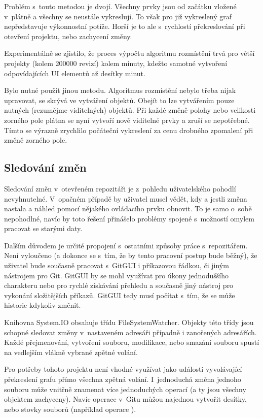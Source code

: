 \documentclass[
  biblatex,
  glossaries,
  index
]{kidiplom}
\begin{document}
Problém s~touto metodou je dvojí. Všechny prvky jsou od začátku vložené v~plátně a všechny se neustále vykreslují. To však pro již vykreslený graf nepředstavuje výkonnostní potíže. Horší je to ale s~rychlostí překreslování při otevření projektu, nebo zachycení změny.

Experimentálně se zjistilo, že proces výpočtu algoritmu rozmístění trvá pro větší projekty (kolem 200000 revizí) kolem minuty, kdežto samotné vytvoření odpovídajících UI elementů až desítky minut.

Bylo nutné použít jinou metodu. Algoritmus rozmístění nebylo třeba nijak upravovat,  se skrývá ve vytváření objektů. Obejít to lze vytvářením pouze nutných (rezumějme viditelných) objektů. Při každé změně polohy nebo velikosti zorného pole plátna se nyní vytvoří nově viditelné prvky a zruší se nepotřebné. Tímto se výrazně zrychlilo počáteční vykreslení za cenu drobného zpomalení při změně zorného pole.

\subsection{Sledování změn}
Sledování změn v~otevřeném repozitáři je z~pohledu uživatelského pohodlí nevyhnutelné. V~opačném případě by uživatel musel vědět, kdy a jestli změna nastala a náhled pomocí nějakého ovládacího prvku obnovit. To je samo o~sobě nepohodlné, navíc by toto řešení přinášelo problémy spojené s~možností omylem pracovat se starými daty.

Dalším důvodem je určité propojení s~ostatními způsoby práce s~repozitářem. Není vyloučeno (a dokonce se s~tím, že by tento pracovní postup bude běžný), že uživatel bude současně pracovat s~GitGUI i příkazovou řádkou, či jiným nástrojem pro Git. GitGUI by se mohl využívat pro úkony jednoduššího charakteru nebo pro rychlé získávání přehledu a současně jiný nástroj pro vykonání složitějších příkazů.
GitGUI tedy musí počítat s~tím, že se může historie kdykoliv změnit.

Knihovna System.IO obsahuje třídu FileSystemWatcher. Objekty této třídy jsou schopné sledovat změny v~nastaveném adresáři případně i zanořených adresářích. Každé přejmenování, vytvoření souboru, modifikace, nebo smazání souboru spustí na vedlejším vlákně vybrané zpětné volání.

Pro potřeby tohoto projektu není vhodné využívat jako události vyvolávající překreslení grafu přímo všechna zpětná volání. I~jednoduchá změna jednoho souboru může vnitřně znamenat více jednoduchých operací (a ty jsou všechny objektem zachyceny). Navíc operace v~Gitu můžou najednou vytvořit desítky, nebo stovky souborů (například operace ).
\end{document}
